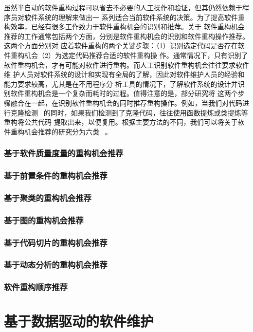虽然半自动的软件重构过程可以省去不必要的人工操作和验证，但其仍然依赖于程序员对软件系统的理解来做出一
系列适合当前软件系统的决策。为了提高软件重构效率，已经有很多工作致力于软件重构机会的识别和推荐。关于
软件重构机会推荐的工作通常包括两个方面，分别是软件重构机会的识别和软件重构操作推荐。这两个方面分别对
应着软件重构的两个关键步骤：（1）识别选定代码是否存在软件重构机会（2）为选定代码推荐合适的软件重构操
作。通常情况下，只有识别了软件重构机会，才有可能对软件进行重构。而人工识别软件重构机会往往要求软件维
护人员对软件系统的设计和实现有全局的了解，因此对软件维护人员的经验和能力要求较高，尤其是在不用程序分
析工具的情况下，了解软件系统的设计并识别软件重构机会是一个复杂而耗时的过程。值得注意的是，部分研究将
这两个步骤融合在一起，在识别软件重构机会的同时推荐重构操作。例如，当我们对代码进行克隆检测
~\cite{kamiya2002ccfinder}的同时，如果我们检测到了克隆代码，往往使用函数提炼或类提炼等重构将公共代码
提取出来，以便复用。根据主要方法的不同，我们可以将关于软件重构机会推荐的研究分为六类
~\cite{al2015identifying}。

 

\subsubsection{基于软件质量度量的重构机会推荐}
\subsubsection{基于前置条件的重构机会推荐}
\subsubsection{基于聚类的重构机会推荐}
\subsubsection{基于图的重构机会推荐}
\subsubsection{基于代码切片的重构机会推荐}
\subsubsection{基于动态分析的重构机会推荐}

\subsubsection{软件重构顺序推荐}

\section{基于数据驱动的软件维护}